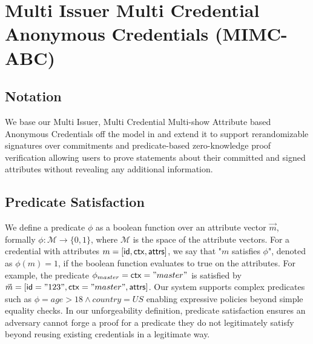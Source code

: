 \mychapter{}

\section{Multi Issuer Multi Credential Anonymous Credentials (MIMC-ABC)}\label{sec:mimc}


\subsection{Notation}
We base our Multi Issuer, Multi Credential Multi-show Attribute based Anonymous Credentials off the model in \cite{fuchsbauer_structure-preserving_2019} and extend it to support rerandomizable signatures over commitments and predicate-based zero-knowledge proof verification allowing users to prove statements about their committed and signed attributes without revealing any additional information.

\subsection{Predicate Satisfaction}
We define a predicate $\phi$ as a boolean function over an attribute vector $\vec{m}$, formally  $\phi: \mathcal{M} \rightarrow \{0,1\}$, where $\mathcal{M}$ is the space of the attribute vectors. 
For a credential with attributes $m = [\mathsf{id}, \mathsf{ctx}, \mathsf{attrs}]$, we say that "$m$ satisfies $\phi$", denoted as $\phi(m) = 1$, if the boolean function evaluates to true on the attributes.
For example, the predicate $\phi_{master} = \mathsf{ctx} = "master"$ is satisfied by $\vec{m} = [\mathsf{id}="123", \mathsf{ctx}="master", \mathsf{attrs}]$. Our system supports complex predicates such as $\phi = age > 18 \wedge country = US$ enabling expressive policies beyond simple equality checks. In our unforgeability definition, predicate satisfaction ensures an adversary cannot forge a proof for a predicate they do not legitimately satisfy beyond reusing existing credentials in a legitimate way.

